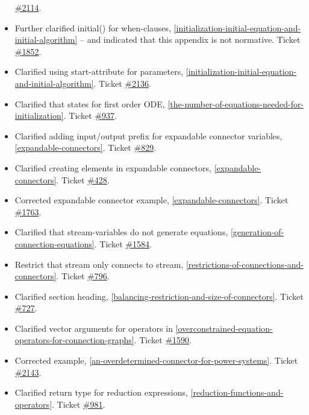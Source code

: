 \documentclass[10pt,a4paper]{report}
\begin{document}
\begin{itemize}
  \href{https://trac.modelica.org/Modelica/ticket/2114}{\#2114}.
\item
  Further clarified initial() for when-clauses, \ref{initialization-initial-equation-and-initial-algorithm} -- and
  indicated that this appendix is not normative. Ticket
  \href{https://trac.modelica.org/Modelica/ticket/1852}{\#1852}.
\item
  Clarified using start-attribute for parameters, \ref{initialization-initial-equation-and-initial-algorithm}. Ticket
  \href{https://trac.modelica.org/Modelica/ticket/2136}{\#2136}.
\item
  Clarified that states for first order ODE, \ref{the-number-of-equations-needed-for-initialization}. Ticket
  \href{https://trac.modelica.org/Modelica/ticket/937}{\#937}.
\item
  Clarified adding input/output prefix for expandable connector
  variables, \ref{expandable-connectors}. Ticket
  \href{https://trac.modelica.org/Modelica/ticket/829}{\#829}.
\item
  Clarified creating elements in expandable connectors, \ref{expandable-connectors}.
  Ticket \href{https://trac.modelica.org/Modelica/ticket/428}{\#428}.
\item
  Corrected expandable connector example, \ref{expandable-connectors}. Ticket
  \href{https://trac.modelica.org/Modelica/ticket/1763}{\#1763}.
\item
  Clarified that stream-variables do not generate equations, \ref{generation-of-connection-equations}. Ticket
  \href{https://trac.modelica.org/Modelica/ticket/1584}{\#1584}.
\item
  Restrict that stream only connects to stream, \ref{restrictions-of-connections-and-connectors}. Ticket
  \href{https://trac.modelica.org/Modelica/ticket/796}{\#796}.
\item
  Clarified section heading, \ref{balancing-restriction-and-size-of-connectors}. Ticket
  \href{https://trac.modelica.org/Modelica/ticket/727}{\#727}.
\item
  Clarified vector arguments for operators in \ref{overconstrained-equation-operators-for-connection-graphs}. Ticket
  \href{https://trac.modelica.org/Modelica/ticket/1590}{\#1590}.
\item
  Corrected example, \ref{an-overdetermined-connector-for-power-systems}. Ticket
  \href{https://trac.modelica.org/Modelica/ticket/2143}{\#2143}.
\item
  Clarified return type for reduction expressions, \ref{reduction-functions-and-operators}.
  Ticket \href{https://trac.modelica.org/Modelica/ticket/981}{\#981}.

\end{itemize}
\end{document}
